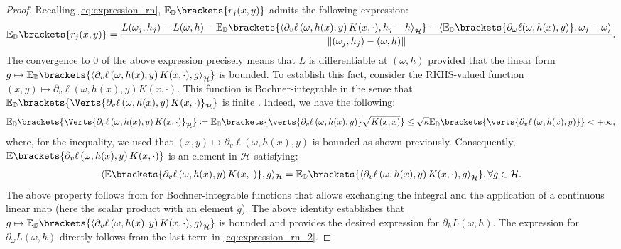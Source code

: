 \begin{proof}
	Recalling \cref{eq:expression_rn},  $\mathbb{E}_{\mathbb{\PP}}\brackets{r_j(x,y)}$ admits the following expression:
	\begin{align}\label{eq:expression_rn_2}
		\mathbb{E}_{\mathbb{\PP}}\brackets{r_j(x,y)} = \frac{L(\omega_j,h_j)-L(\omega,h)-\mathbb{E}_{\PP}\brackets{\left\langle\partial_v\ell\left(\omega,h(x),y\right)K(x,\cdot),h_j-h\right\rangle_\mathcal{H}}- \langle \mathbb{E}_{\PP}\brackets{\partial_{\omega}\ell(\omega,h(x),y)},\omega_j-\omega\rangle}{\left\|(\omega_j,h_j)-(\omega,h)\right\|}.
	\end{align}
	The convergence to $0$ of the above expression precisely means that $L$ is differentiable at $(\omega,h)$ provided that the linear form $g\mapsto\mathbb{E}_{\PP}\brackets{\left\langle\partial_v\ell\left(\omega,h(x),y\right)K(x,\cdot),g\right\rangle_\mathcal{H}}$ is bounded. To establish this fact, consider the RKHS-valued function $(x,y)\mapsto \partial_v\ell\left(\omega,h(x),y\right)K(x,\cdot)$. 
	This function is Bochner-integrable in the sense that $\mathbb{E}_{\PP}\brackets{\Verts{\partial_v\ell\left(\omega,h(x),y\right)K(x,\cdot)}_\mathcal{H}}$ is finite \citep[Definition~1,~Chapter~2]{diestel1977vector}. Indeed, we have the following:
\begin{align*}
	\mathbb{E}_{\PP}\brackets{\Verts{\partial_v\ell\left(\omega,h(x),y\right)K(x,\cdot)}_\mathcal{H}} \coloneqq \mathbb{E}_{\PP}\brackets{\verts{\partial_v\ell\left(\omega,h(x),y\right)}\sqrt{K(x,x)}}
	\leq \sqrt{\kappa}\mathbb{E}_{\PP}\brackets{\verts{\partial_v\ell\left(\omega,h(x),y\right)}}<+\infty,
\end{align*}
where, for the inequality, we used that $(x,y)\mapsto\partial_v\ell(\omega,h(x),y)$ is bounded as shown previously. Consequently, $\mathbb{E}\brackets{\partial_v\ell\left(\omega,h(x),y\right)K(x,\cdot)}$ is an element in $\mathcal{H}$ satisfying:
\begin{align*}
	\langle\mathbb{E}\brackets{\partial_v\ell\left(\omega,h(x),y\right)K(x,\cdot)},  g\rangle_{\mathcal{H}}=\mathbb{E}_{\PP}\brackets{\left\langle\partial_v\ell\left(\omega,h(x),y\right)K(x,\cdot),g\right\rangle_\mathcal{H}},\forall g\in \mathcal{H}.
\end{align*}
The above property follows from \citep[Theorem~6,~Chapter~2]{diestel1977vector} for Bochner-integrable functions that allows exchanging the integral and the application of a continuous linear map (here the scalar product with an element $g$). The above identity establishes that $g\mapsto\mathbb{E}_{\PP}\brackets{\left\langle\partial_v\ell\left(\omega,h(x),y\right)K(x,\cdot),g\right\rangle_\mathcal{H}}$ is bounded and provides the desired expression for $\partial_h L(\omega,h)$. The expression for $\partial_{\omega} L(\omega,h)$ directly follows from the last term in \cref{eq:expression_rn_2}.


\end{proof}
